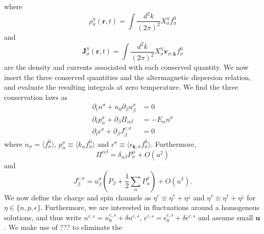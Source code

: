 \documentclass[aps,prb,reprint,twocolumns,superscriptaddress,nofootinbib]{revtex4-2}
\begin{document}
where 
\begin{equation}
	\rho^\eta_\sigma(\bm r,t) = \int \frac{d^2k}{(2\pi)^2} X^\eta_\sigma f^0_\sigma
\end{equation}
and \begin{equation}
	\bm J^\eta_\sigma(\bm r,t) = \int \frac{d^2k}{(2\pi)^2} X^\eta_\sigma \bm v_{\sigma;\bm k} f^0_\sigma
\end{equation}
are the density and currents associated with each conserved quantity. We now insert the three conserved quantities and the altermagnetic dispersion relation, and evaluate the resulting integrals at zero temperature. We find the three conservation laws as
\begin{align}
	\partial_t n^\sigma + n_0 \partial_\beta u_\beta^\sigma &= 0 \\
	\partial_t p^\sigma_\alpha + \partial_\beta \Pi_{\alpha\beta} &=  -E_\alpha n^\sigma  \\ 
	\partial_t \epsilon^\sigma + \partial_\beta J^{\epsilon;\sigma}_{\beta} &= 0
\end{align}
where $n_\sigma=\langle f_\sigma^0\rangle$, $p^\sigma_\alpha\equiv\langle k_\alpha f_\sigma^0\rangle$ and $\epsilon^\sigma\equiv\langle \epsilon_{\bm k;\sigma}f_\sigma^0\rangle$. Furthermore,
\begin{equation}
	\Pi^{\alpha\beta} = \delta_{\alpha\beta} P^\alpha_\sigma +O(u^2) %
\end{equation}
and \begin{equation}
	J^{\epsilon;\sigma}_\beta =  u_\beta^\sigma (P_\beta+\frac12\sum_\alpha P_\alpha^\sigma)+O(u^3).
\end{equation}
We now define the charge and spin channels as $\eta^c\equiv \eta^\uparrow+\eta^\downarrow$ and $\eta^s\equiv \eta^\uparrow+\eta^\downarrow$ for $\eta\in\{n,p,\epsilon\}$. Furthermore, we are interested in fluctuations around a homogenous solutions, and thus write $n^{c,s}=n_0^{c,s}+\delta n^{c,s}$, $\epsilon^{c,s}=\epsilon_0^{c,s}+\delta \epsilon^{c,s}$ and assume small $\bm u$. We make use of ??? to eliminate the 
\end{document}
